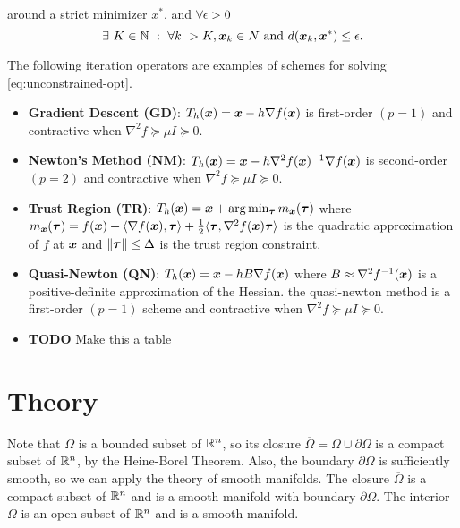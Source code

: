 \documentclass[10pt]{article}
\begin{document}
{\begin{definition}
\begin{enumerate}
                around a strict minimizer $x^*$. and $\forall \epsilon > 0$ 
                $$
                    \exists~ K \in \mathbb{N} ~:~ \forall k ~ > K, \bm{x}_k \in N \text{ and } 
                    d(\bm{x}_k, \bm{x}^*) \leq \epsilon.
                $$
            \end{enumerate}
        \end{definition}
        The following iteration operators are examples of schemes for solving
        \eqref{eq:unconstrained-opt}.
        \begin{itemize}
            \item \textbf{Gradient Descent (GD)}: $T_h(\bm{x}) = \bm{x} - h \nabla f(\bm{x})$
            is first-order $(p = 1)$ and contractive when $\nabla^2 f \succeq \mu I \succeq 0$.
            \item \textbf{Newton's Method (NM)}: $T_h(\bm{x}) = \bm{x} - h \nabla^2 f(\bm{x})^{-1} \nabla f(\bm{x})$
            is second-order $(p = 2)$ and contractive when $\nabla^2 f \succeq \mu I \succeq 0$.
            \item \textbf{Trust Region (TR)}: $T_h(\bm{x}) = \bm{x} + \arg \min_{\bm{\tau}} m_{\bm{x}}(\bm{\tau})$
            where $m_{\bm{x}}(\bm{\tau}) = f(\bm{x}) + \langle \nabla f(\bm{x}), \bm{\tau} \rangle +
            \frac{1}{2} \langle \bm{\tau}, \nabla^2 f(\bm{x}) \bm{\tau} \rangle$ is the quadratic approximation
            of $f$ at $\bm{x}$ and $\|\bm{\tau}\| \leq \Delta$ is the trust region constraint.
            \item \textbf{Quasi-Newton (QN)}: $T_h(\bm{x}) = \bm{x} - h B \nabla f(\bm{x})$ where
            $B \approx \nabla^2 f^{-1}(\bm{x})$ is a positive-definite approximation of the Hessian.
            the quasi-newton method is a first-order $(p = 1)$ scheme and contractive when
            $\nabla^2 f \succeq \mu I \succeq 0$.
            \item \textbf{TODO} Make this a table
        \end{itemize}
    }

    \medskip

    
\section{Theory}
    Note that $\Omega$ is a bounded subset of $\mathbb{R}^n$, so its closure
    $\overline{\Omega} = \Omega \cup \partial \Omega$ is a compact subset
    of $\mathbb{R}^n$, by the Heine-Borel Theorem.
    Also, the boundary $\partial \Omega$ is sufficiently smooth,
    so we can apply the theory of smooth manifolds.
    The closure $\overline{\Omega}$ is a compact subset of $\mathbb{R}^n$ and
    is a smooth manifold with boundary $\partial \Omega$.
    The interior $\Omega$ is an open subset of $\mathbb{R}^n$ and is a smooth manifold.
\end{document}
